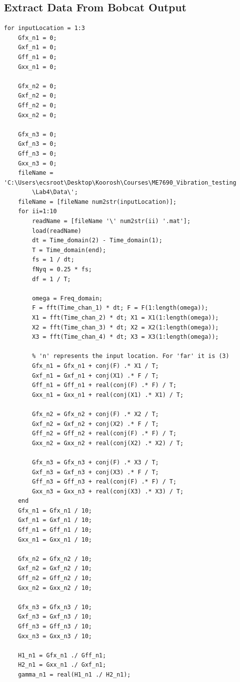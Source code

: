 \documentclass[paper=a4, fontsize=12pt]{scrartcl} %
\begin{document}
\subsection*{Extract Data From Bobcat Output}
\begin{lstlisting}
for inputLocation = 1:3
    Gfx_n1 = 0;
    Gxf_n1 = 0;
    Gff_n1 = 0;
    Gxx_n1 = 0;

    Gfx_n2 = 0;
    Gxf_n2 = 0;
    Gff_n2 = 0;
    Gxx_n2 = 0;

    Gfx_n3 = 0;
    Gxf_n3 = 0;
    Gff_n3 = 0;
    Gxx_n3 = 0;
    fileName = 'C:\Users\ecsroot\Desktop\Koorosh\Courses\ME7690_Vibration_testing
    	\Lab4\Data\';
    fileName = [fileName num2str(inputLocation)];
    for ii=1:10
        readName = [fileName '\' num2str(ii) '.mat'];
        load(readName)
        dt = Time_domain(2) - Time_domain(1);
        T = Time_domain(end);
        fs = 1 / dt;
        fNyq = 0.25 * fs;
        df = 1 / T;

        omega = Freq_domain;
        F = fft(Time_chan_1) * dt; F = F(1:length(omega));
        X1 = fft(Time_chan_2) * dt; X1 = X1(1:length(omega));
        X2 = fft(Time_chan_3) * dt; X2 = X2(1:length(omega));
        X3 = fft(Time_chan_4) * dt; X3 = X3(1:length(omega));

        % 'n' represents the input location. For 'far' it is (3) 
        Gfx_n1 = Gfx_n1 + conj(F) .* X1 / T;
        Gxf_n1 = Gxf_n1 + conj(X1) .* F / T;
        Gff_n1 = Gff_n1 + real(conj(F) .* F) / T;
        Gxx_n1 = Gxx_n1 + real(conj(X1) .* X1) / T;

        Gfx_n2 = Gfx_n2 + conj(F) .* X2 / T;
        Gxf_n2 = Gxf_n2 + conj(X2) .* F / T;
        Gff_n2 = Gff_n2 + real(conj(F) .* F) / T;
        Gxx_n2 = Gxx_n2 + real(conj(X2) .* X2) / T;

        Gfx_n3 = Gfx_n3 + conj(F) .* X3 / T;
        Gxf_n3 = Gxf_n3 + conj(X3) .* F / T;
        Gff_n3 = Gff_n3 + real(conj(F) .* F) / T;
        Gxx_n3 = Gxx_n3 + real(conj(X3) .* X3) / T;
    end
    Gfx_n1 = Gfx_n1 / 10;
    Gxf_n1 = Gxf_n1 / 10;
    Gff_n1 = Gff_n1 / 10;
    Gxx_n1 = Gxx_n1 / 10;

    Gfx_n2 = Gfx_n2 / 10;
    Gxf_n2 = Gxf_n2 / 10;
    Gff_n2 = Gff_n2 / 10;
    Gxx_n2 = Gxx_n2 / 10;

    Gfx_n3 = Gfx_n3 / 10;
    Gxf_n3 = Gxf_n3 / 10;
    Gff_n3 = Gff_n3 / 10;
    Gxx_n3 = Gxx_n3 / 10;

    H1_n1 = Gfx_n1 ./ Gff_n1;
    H2_n1 = Gxx_n1 ./ Gxf_n1;
    gamma_n1 = real(H1_n1 ./ H2_n1);


\end{lstlisting}
\end{document}
